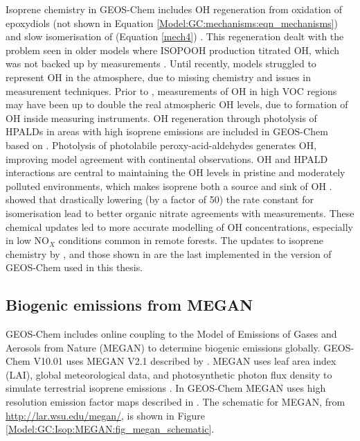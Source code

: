       Isoprene chemistry in GEOS-Chem includes OH regeneration from oxidation of epoxydiols (not shown in Equation \ref{Model:GC:mechanisms:eqn_mechanisms}) and slow isomerisation of \roo (Equation \ref{mech4}) \parencite{Mao2013}.
      This regeneration dealt with the problem seen in older models where ISOPOOH production titrated OH, which was not backed up by measurements \parencite{Paulot2009b,Mao2013}.
      Until recently, models struggled to represent OH in the atmosphere, due to missing chemistry and issues in measurement techniques.
      Prior to \textcite{Mao2012}, measurements of OH in high VOC regions may have been up to double the real atmospheric OH levels, due to formation of OH inside measuring instruments.
      OH regeneration through photolysis of HPALDs in areas with high isoprene emissions are included in GEOS-Chem based on \textcite{Peeters2010}.
      Photolysis of photolabile peroxy-acid-aldehydes generates OH, improving model agreement with continental observations.
      OH and HPALD interactions are central to maintaining the OH levels in pristine and moderately polluted environments, which makes isoprene both a source and sink of OH \parencite{Peeters2010,Taraborrelli2012}.
      \textcite{Mao2013} showed that drastically lowering (by a factor of 50) the rate constant for \roo isomerisation lead to better organic nitrate agreements with measurements.%
      These chemical updates led to more accurate modelling of OH concentrations, especially in low NO$_X$ conditions common in remote forests.
      The updates to isoprene chemistry by \textcite{Mao2013}, and those shown in \textcite{Crounse2011,Crounse2012} are the last implemented in the version of GEOS-Chem used in this thesis.


  \subsection{Biogenic emissions from MEGAN}
    \label{Model:GC:MEGAN}
    
    GEOS-Chem includes online coupling to the Model of Emissions of Gases and Aerosols from Nature (MEGAN) to determine biogenic emissions globally.
    GEOS-Chem V10.01 uses MEGAN V2.1 described by \textcite{Guenther2012}.
    MEGAN uses leaf area index (LAI), global meteorological data, and photosynthetic photon flux density to simulate terrestrial isoprene emissions \parencite{Kefauver2014}.
    In GEOS-Chem MEGAN uses high resolution emission factor maps described in \textcite{Guenther2012}. %
    The schematic for MEGAN, from \url{http://lar.wsu.edu/megan/}, is shown in Figure \ref{Model:GC:Isop:MEGAN:fig_megan_schematic}.
    
